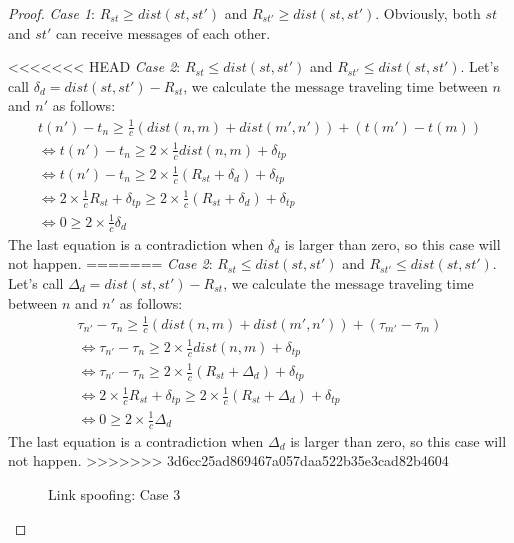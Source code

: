\begin{flushleft}
\begin{flushleft}
\begin{Definition}
\begin{itemize}
\begin{Definition}
\begin{proof}
\emph{Case 1}: $R_{st} \ge dist(st,st')$ and $R_{st'} \ge dist(st,st')$. Obviously, both $st$ and $st'$ can receive messages of each other. 

<<<<<<< HEAD
\emph{Case 2}: $R_{st} \le dist(st,st')$ and $R_{st'} \le dist(st,st')$. Let's call $\delta_d = dist(st,st') - R_{st}$, we calculate the message traveling time between $n$ and $n'$ as follows: 
\begin{equation*}
\begin{split}
	 t(n') - t_n \ge \frac 1 {c}(dist(n,m) + dist(m', n')) + (t(m') - t(m)) \\ \Leftrightarrow
	t(n') - t_n \ge 2 \times \frac 1 {c} dist(n,m) + \delta_{tp}  \\
\Leftrightarrow	t(n') - t_n \ge 2 \times \frac 1 {c}(R_{st} + \delta_d) + \delta_{tp} \\
\Leftrightarrow	2 \times \frac 1 {c} R_{st} + \delta_{tp} \ge 2 \times \frac 1 {c} (R_{st} + \delta_d) + \delta_{tp} \\
\Leftrightarrow	0 \ge 2 \times \frac 1 {c} \delta_d 
\end{split}
\end{equation*}
The last equation is a contradiction when $\delta_d$ is larger than zero, so this case will not happen. 
=======
\emph{Case 2}: $R_{st} \le dist(st,st')$ and $R_{st'} \le dist(st,st')$. Let's call $\Delta_d = dist(st,st') - R_{st}$, we calculate the message traveling time between $n$ and $n'$ as follows: 
\begin{equation*}
\begin{split}
	 \tau_{n'} - \tau_{n} \ge \frac 1 {c}(dist(n,m) + dist(m', n')) + (\tau_{m'} - \tau_{m}) \\ \Leftrightarrow
	\tau_{n'} - \tau_{n} \ge 2 \times \frac 1 {c} dist(n,m) + \delta_{tp}  \\
\Leftrightarrow	\tau_{n'} - \tau_{n} \ge 2 \times \frac 1 {c}(R_{st} + \Delta_d) + \delta_{tp} \\
\Leftrightarrow	2 \times \frac 1 {c} R_{st} + \delta_{tp} \ge 2 \times \frac 1 {c} (R_{st} + \Delta_d) + \delta_{tp} \\
\Leftrightarrow	0 \ge 2 \times \frac 1 {c} \Delta_d 
\end{split}
\end{equation*}
The last equation is a contradiction when $\Delta_d$ is larger than zero, so this case will not happen. 
>>>>>>> 3d6cc25ad869467a057daa522b35e3cad82b4604

\begin{figure}
	\caption{Link spoofing: Case 3} \label{chap3case3}
	\centering
\end{figure}
		

\end{proof}
\end{Definition}
\end{itemize}
\end{Definition}
\end{flushleft}
\end{flushleft}

